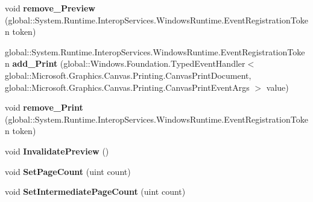 \begin{DoxyCompactItemize}
void {\bfseries remove\+\_\+\+Preview} (global\+::\+System.\+Runtime.\+Interop\+Services.\+Windows\+Runtime.\+Event\+Registration\+Token token)
\item 
\mbox{\label{interface_microsoft_1_1_graphics_1_1_canvas_1_1_printing_1_1_i_canvas_print_document_a4a78f4b715e692c620d4548df21d5ac0}} 
global\+::\+System.\+Runtime.\+Interop\+Services.\+Windows\+Runtime.\+Event\+Registration\+Token {\bfseries add\+\_\+\+Print} (global\+::\+Windows.\+Foundation.\+Typed\+Event\+Handler$<$ global\+::\+Microsoft.\+Graphics.\+Canvas.\+Printing.\+Canvas\+Print\+Document, global\+::\+Microsoft.\+Graphics.\+Canvas.\+Printing.\+Canvas\+Print\+Event\+Args $>$ value)
\item 
\mbox{\label{interface_microsoft_1_1_graphics_1_1_canvas_1_1_printing_1_1_i_canvas_print_document_a6c6e9590103da951592e47820ae53fdb}} 
void {\bfseries remove\+\_\+\+Print} (global\+::\+System.\+Runtime.\+Interop\+Services.\+Windows\+Runtime.\+Event\+Registration\+Token token)
\item 
\mbox{\label{interface_microsoft_1_1_graphics_1_1_canvas_1_1_printing_1_1_i_canvas_print_document_a6624a11a39bdacc1332f7370fe4e289a}} 
void {\bfseries Invalidate\+Preview} ()
\item 
\mbox{\label{interface_microsoft_1_1_graphics_1_1_canvas_1_1_printing_1_1_i_canvas_print_document_a27ce0b5fa1108240d85779236c1ab571}} 
void {\bfseries Set\+Page\+Count} (uint count)
\item 
\mbox{\label{interface_microsoft_1_1_graphics_1_1_canvas_1_1_printing_1_1_i_canvas_print_document_a7f760cb71cc746fd247a12e55ba416a1}} 
void {\bfseries Set\+Intermediate\+Page\+Count} (uint count)
\item 
\mbox{\label{interface_microsoft_1_1_graphics_1_1_canvas_1_1_printing_1_1_i_canvas_print_document_a1de4b2e4a0bbe65d5a50f8cfd5b275ff}} 

\end{DoxyCompactItemize}
